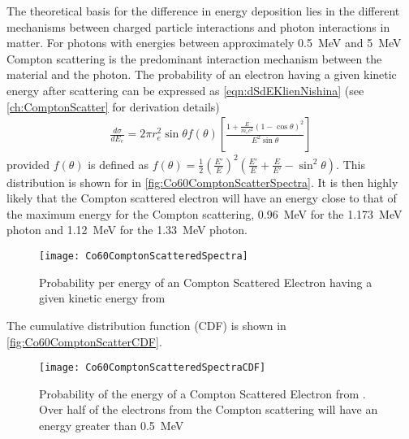 The theoretical basis for the difference in energy deposition lies in the different mechanisms between charged particle interactions and photon interactions in matter.
For photons with energies between approximately \SI{0.5}{\MeV} and \SI{5}{\MeV} Compton scattering is the predominant interaction mechanism between the material and the photon.
The probability of an electron having a given kinetic energy after scattering can be expressed as \autoref{eqn:dSdEKlienNishina} (see \autoref{ch:ComptonScatter} for derivation details)
\begin{align}
  \label{eqn:dSdEKleinNishina}
\frac{d\sigma}{dE_e} = 2\pi r_e^2 \sin \theta f(\theta)\left [ \frac{1+\frac{E}{m_e c^2}\left(1-\cos\theta \right)^2}{E^2 \sin \theta} \right ]
\end{align}
provided  $f(\theta)$ is defined as $f(\theta) = \frac{1}{2}\left(\frac{E'}{E}\right)^2 \left(\frac{E'}{E} + \frac{E}{E'}-\sin^2\theta\right)$.
This distribution is shown for  in \autoref{fig:Co60ComptonScatterSpectra}.
It is then highly likely that the Compton scattered electron will have an energy close to that of the maximum energy for the Compton scattering, \SI{0.96}{\MeV} for the \SI{1.173}{\MeV} photon and \SI{1.12}{\MeV} for the \SI{1.33}{\MeV} photon.
\begin{figure}
  \centering
  \texttt{[image: Co60ComptonScatteredSpectra]}
  \caption[Gamma (Co-60) Compton Scattered Spectra]{Probability per energy of an Compton Scattered Electron having a given kinetic energy from }
  \label{fig:Co60ComptonScatterSpectra}
\end{figure}
The cumulative distribution function (CDF) is shown in \autoref{fig:Co60ComptonScatterCDF}.
\begin{figure}
  \centering
  \texttt{[image: Co60ComptonScatteredSpectraCDF]}
  \caption[Gamma (Co-60) Compton Scattered CDF]{Probability of the energy of a Compton Scattered Electron from . Over half of the electrons from the Compton scattering will have an energy greater than \SI{0.5}{\MeV}}
  \label{fig:Co60ComptonScatterCDF}
\end{figure}
